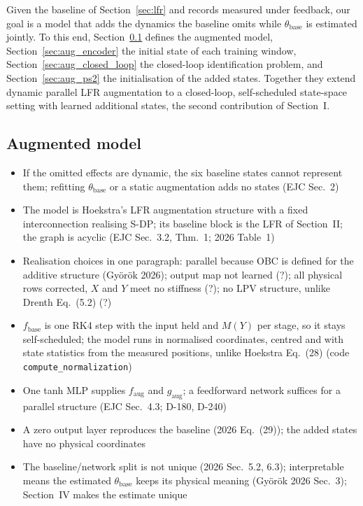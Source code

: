 Given the baseline of Section~\ref{sec:lfr} and records measured under
feedback, our goal is a model that adds the dynamics the baseline omits while
$\theta_{\mathrm{base}}$ is estimated jointly.
To this end, Section~\ref{sec:aug_structure} defines the augmented model,
Section~\ref{sec:aug_encoder} the initial state of each training window,
Section~\ref{sec:aug_closed_loop} the closed-loop identification problem, and
Section~\ref{sec:aug_ps2} the initialisation of the added states.
Together they extend dynamic parallel LFR augmentation to a closed-loop,
self-scheduled state-space setting with learned additional states, the second
contribution of Section~I.

\subsection{Augmented model}\label{sec:aug_structure}
\ifdraft
\begin{itemize}
\item If the omitted effects are dynamic, the six baseline states cannot represent them; refitting $\theta_{\mathrm{base}}$ or a static augmentation adds no states (EJC Sec.~2)
\item The model is Hoekstra's LFR augmentation structure with a fixed interconnection realising S-DP; its baseline block is the LFR of Section~II; the graph is acyclic (EJC Sec.~3.2, Thm.~1; 2026 Table~1)
\item Realisation choices in one paragraph: parallel because OBC is defined for the additive structure (Gy\"or\"ok 2026); output map not learned (?); all physical rows corrected, $X$ and $Y$ meet no stiffness (?); no LPV structure, unlike Drenth Eq.~(5.2) (?)
\item $f_{\mathrm{base}}$ is one RK4 step with the input held and $M(Y)$ per stage, so it stays self-scheduled; the model runs in normalised coordinates, centred and with state statistics from the measured positions, unlike Hoekstra Eq.~(28) (code \texttt{compute\_normalization})
\item One tanh MLP supplies $f_{\mathrm{aug}}$ and $g_{\mathrm{aug}}$; a feedforward network suffices for a parallel structure (EJC Sec.~4.3; D-180, D-240)
\item A zero output layer reproduces the baseline (2026 Eq.~(29)); the added states have no physical coordinates
\item The baseline/network split is not unique (2026 Sec.~5.2, 6.3); interpretable means the estimated $\theta_{\mathrm{base}}$ keeps its physical meaning (Gy\"or\"ok 2026 Sec.~3); Section~IV makes the estimate unique
\end{itemize}
\fi

